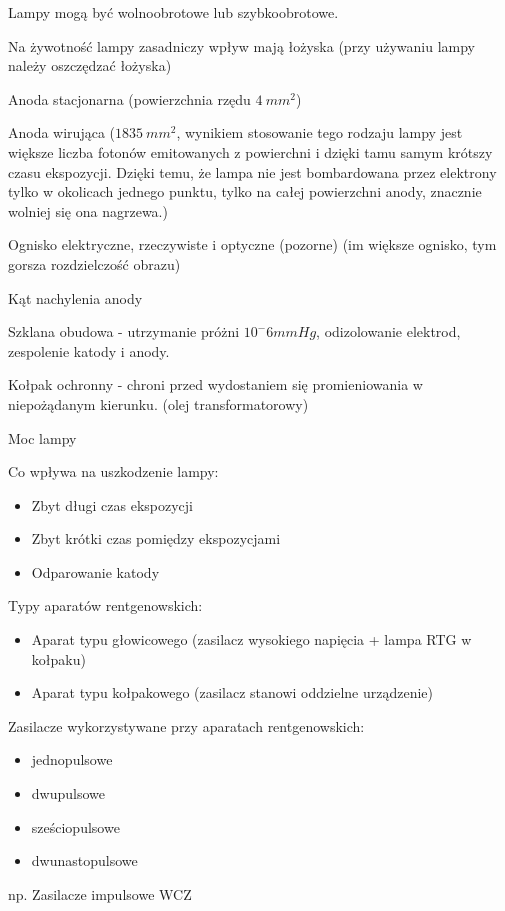 \documentclass{article}
\begin{document}
Lampy mogą być wolnoobrotowe lub szybkoobrotowe.

Na żywotność lampy zasadniczy wpływ mają łożyska (przy używaniu lampy należy oszczędzać łożyska)

Anoda stacjonarna (powierzchnia rzędu $4~mm^2$)

Anoda wirująca ($1835~mm^2$, wynikiem stosowanie tego rodzaju lampy jest większe liczba fotonów emitowanych z powierchni i dzięki tamu samym krótszy czasu ekspozycji. Dzięki temu, że lampa nie jest bombardowana przez elektrony tylko w okolicach jednego punktu, tylko na całej powierzchni anody, znacznie wolniej się ona nagrzewa.)

Ognisko elektryczne, rzeczywiste i optyczne (pozorne) (im większe ognisko, tym gorsza rozdzielczość obrazu)

Kąt nachylenia anody

Szklana obudowa - utrzymanie próżni $10^-6 mmHg$, odizolowanie elektrod, zespolenie katody i anody.

Kołpak ochronny - chroni przed wydostaniem się promieniowania w niepożądanym kierunku. (olej transformatorowy)

Moc lampy 

Co wpływa na uszkodzenie lampy:
\begin{itemize}
    \item Zbyt długi czas ekspozycji
    \item Zbyt krótki czas pomiędzy ekspozycjami
    \item Odparowanie katody
\end{itemize}

Typy aparatów rentgenowskich:
\begin{itemize}
    \item Aparat typu głowicowego (zasilacz wysokiego napięcia + lampa RTG w kołpaku)
    \item Aparat typu kołpakowego (zasilacz stanowi oddzielne urządzenie)
\end{itemize}

Zasilacze wykorzystywane przy aparatach rentgenowskich:
\begin{itemize}
    \item jednopulsowe
    \item dwupulsowe
    \item sześciopulsowe
    \item dwunastopulsowe
\end{itemize}

np. Zasilacze impulsowe WCZ
\end{document}
